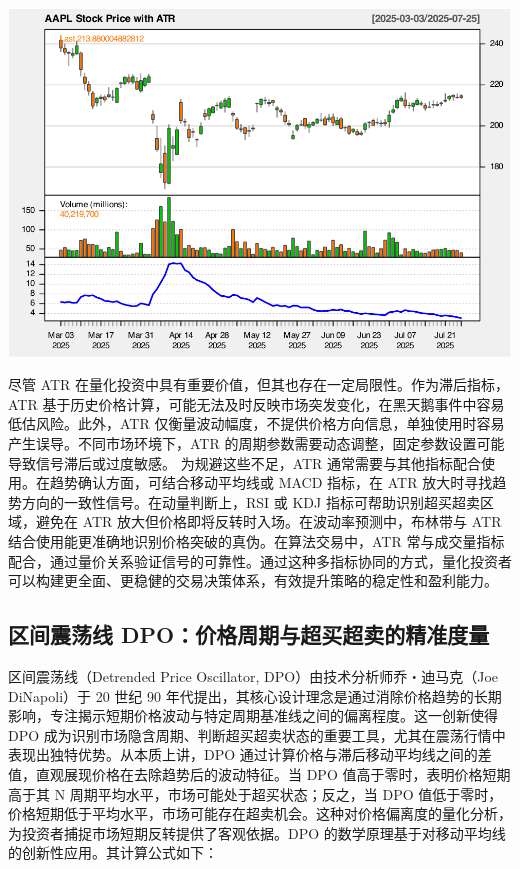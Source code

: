 \documentclass[]{ctexbook}
\begin{document}
\includegraphics[width=0.9\linewidth]{QuantmodHandbook_files/figure-latex/atr-2}

尽管 ATR 在量化投资中具有重要价值，但其也存在一定局限性。作为滞后指标，ATR 基于历史价格计算，可能无法及时反映市场突发变化，在黑天鹅事件中容易低估风险。此外，ATR 仅衡量波动幅度，不提供价格方向信息，单独使用时容易产生误导。不同市场环境下，ATR 的周期参数需要动态调整，固定参数设置可能导致信号滞后或过度敏感。
为规避这些不足，ATR 通常需要与其他指标配合使用。在趋势确认方面，可结合移动平均线或 MACD 指标，在 ATR 放大时寻找趋势方向的一致性信号。在动量判断上，RSI 或 KDJ 指标可帮助识别超买超卖区域，避免在 ATR 放大但价格即将反转时入场。在波动率预测中，布林带与 ATR 结合使用能更准确地识别价格突破的真伪。在算法交易中，ATR 常与成交量指标配合，通过量价关系验证信号的可靠性。通过这种多指标协同的方式，量化投资者可以构建更全面、更稳健的交易决策体系，有效提升策略的稳定性和盈利能力。

\subsection{区间震荡线 DPO：价格周期与超买超卖的精准度量}\label{ux533aux95f4ux9707ux8361ux7ebf-dpoux4ef7ux683cux5468ux671fux4e0eux8d85ux4e70ux8d85ux5356ux7684ux7cbeux51c6ux5ea6ux91cf}

区间震荡线（Detrended Price Oscillator, DPO）由技术分析师乔・迪马克（Joe DiNapoli）于 20 世纪 90 年代提出，其核心设计理念是通过消除价格趋势的长期影响，专注揭示短期价格波动与特定周期基准线之间的偏离程度。这一创新使得 DPO 成为识别市场隐含周期、判断超买超卖状态的重要工具，尤其在震荡行情中表现出独特优势。从本质上讲，DPO 通过计算价格与滞后移动平均线之间的差值，直观展现价格在去除趋势后的波动特征。当 DPO 值高于零时，表明价格短期高于其 N 周期平均水平，市场可能处于超买状态；反之，当 DPO 值低于零时，价格短期低于平均水平，市场可能存在超卖机会。这种对价格偏离度的量化分析，为投资者捕捉市场短期反转提供了客观依据。DPO 的数学原理基于对移动平均线的创新性应用。其计算公式如下：
\end{document}
